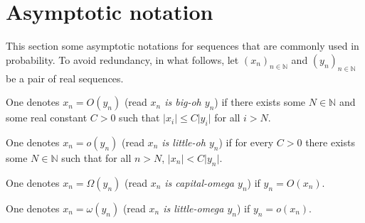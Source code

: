 \documentclass[../../main.tex]{subfiles} %
\begin{document}
\section{Asymptotic notation}
\label{app:asymptotic-notation}
This section some asymptotic notations for sequences that are commonly used 
in probability. To avoid redundancy, in what follows, let \((x_n)_{n \in \mathbb 
N}\) and \((y_n)_{n \in \mathbb N}\) be a pair of real sequences.

\begin{definition}
	One denotes \(x_n = O (y_n)\) (read \textit{\(x_n\) is big-oh \(y_n\)}) if there 
	exists some \(N \in \mathbb N\) and some real constant \(C > 0\) such that 
	\(\vert x_i \vert \leq C \vert y_i \vert\) for all \(i > N\).	
\end{definition}

\begin{definition}
	One denotes \(x_n = o (y_n)\) (read \textit{\(x_n\) is 
	little-oh \(y_n\)}) if for every \(C > 0\) there exists some \(N \in \mathbb N\) 
	such that for all \(n > N\), \(\vert x_n \vert < C \vert y_n \vert\).
\end{definition}

\begin{definition}
	One denotes \(x_n = \Omega (y_n)\) (read \textit{\(x_n\) is capital-omega 
	\(y_n\)}) if \(y_n = O(x_n)\).	
\end{definition}

\begin{definition}
	One denotes \(x_n = \omega (y_n)\) (read \textit{\(x_n\) is little-omega 
		\(y_n\)}) if \(y_n = o (x_n)\).
\end{definition}
\end{document}
